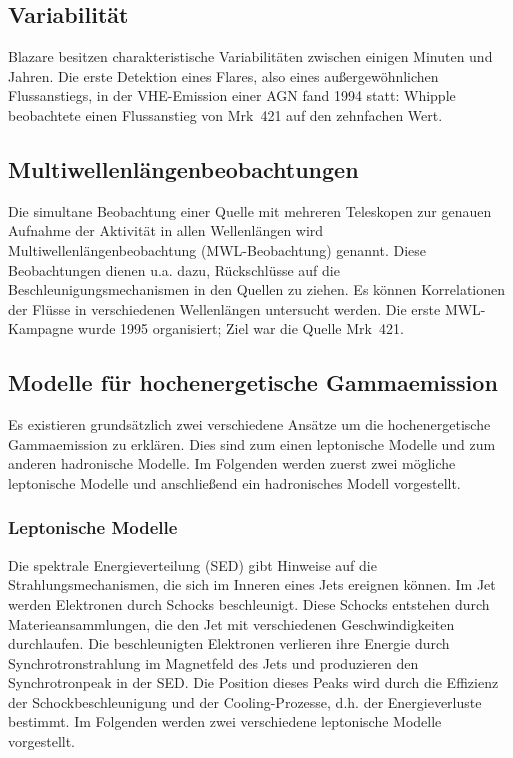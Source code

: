 \subsection{Variabilität}
Blazare besitzen charakteristische Variabilitäten zwischen einigen Minuten und Jahren.
Die erste Detektion eines Flares, also eines außergewöhnlichen Flussanstiegs, in der VHE-Emission einer AGN fand 1994 statt:
Whipple beobachtete einen Flussanstieg von Mrk~421 auf den zehnfachen Wert.\cite{Weekes}\cite{Mrk421_Outburst}

\subsection{Multiwellenlängenbeobachtungen}
Die simultane Beobachtung einer Quelle mit mehreren Teleskopen zur genauen Aufnahme der Aktivität in allen Wellenlängen wird Multiwellenlängenbeobachtung (MWL-Beobachtung) genannt. 
Diese Beobachtungen dienen u.a. dazu, Rückschlüsse auf die Beschleunigungsmechanismen in den Quellen zu ziehen.
Es können Korrelationen der Flüsse in verschiedenen Wellenlängen untersucht werden.
Die erste MWL-Kampagne wurde 1995 organisiert; Ziel war die Quelle Mrk~421.\cite{Weekes}

\subsection{Modelle für hochenergetische Gammaemission}
Es existieren grundsätzlich zwei verschiedene Ansätze um die hochenergetische Gammaemission zu erklären.
Dies sind zum einen leptonische Modelle und zum anderen hadronische Modelle.
Im Folgenden werden zuerst zwei mögliche leptonische Modelle und anschließend ein hadronisches Modell vorgestellt.

\subsubsection{Leptonische Modelle}
Die spektrale Energieverteilung (SED) gibt Hinweise auf die Strahlungsmechanismen, die sich im Inneren eines Jets ereignen können.
Im Jet werden Elektronen durch Schocks beschleunigt. 
Diese Schocks entstehen durch Materieansammlungen, die den Jet mit verschiedenen Geschwindigkeiten durchlaufen.
Die beschleunigten Elektronen verlieren ihre Energie durch Synchrotronstrahlung im Magnetfeld des Jets und produzieren den Synchrotronpeak in der SED.
Die Position dieses Peaks wird durch die Effizienz der Schockbeschleunigung und der Cooling-Prozesse, d.h. der Energieverluste bestimmt. 
Im Folgenden werden zwei verschiedene leptonische Modelle vorgestellt.\cite{Weekes}

